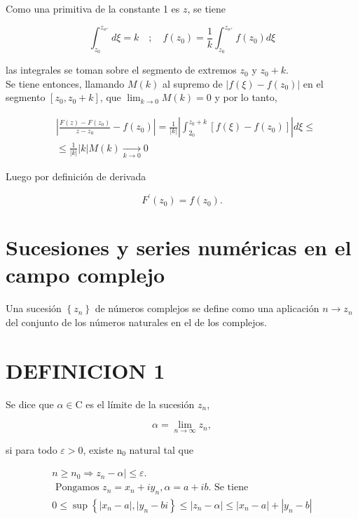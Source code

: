 \documentclass[10pt]{article}
\theoremstyle{plain}
\theoremstyle{definition}
\theoremstyle{remark}
\begin{document}
Como una primitiva de la constante 1 es $z$, se tiene

$$
\int_{z_{0}}^{z_{o^{+}}} d \xi=k \quad ; \quad f\left(z_{0}\right)=\frac{1}{k} \int_{z_{0}}^{z_{o^{+}}} f\left(z_{0}\right) d \xi
$$

las integrales se toman sobre el segmento de extremos $z_{0}$ y $z_{0}+k$.\\
Se tiene entonces, llamando $M(k)$ al supremo de $\left|f(\xi)-f\left(z_{0}\right)\right|$ en el segmento $\left[z_{0}, z_{0}+k\right]$, que $\lim _{k \rightarrow 0} M(k)=0$ y por lo tanto,

$$
\begin{aligned}
& \left|\frac{F(z)-F\left(z_{0}\right)}{z-z_{0}}-f\left(z_{0}\right)\right|=\frac{1}{|k|}\left|\int_{2_{0}}^{z_{0}+k}\left[f(\xi)-f\left(z_{0}\right)\right]\right| d \xi \leqslant \\
& \leqslant \frac{1}{|k|}|k| M(k) \xrightarrow[k \rightarrow 0]{ } 0
\end{aligned}
$$


Luego por definición de derivada

$$
F^{\prime}\left(z_{0}\right)=f\left(z_{0}\right) .
$$

\section{Sucesiones y series numéricas en el campo complejo}
Una sucesión $\left\{z_{n}\right\}$ de números complejos se define como una aplicación $n \rightarrow z_{n}$ del conjunto de los números naturales en el de los complejos.

\section*{DEFINICION 1}
Se dice que $\alpha \in \mathrm{C}$ es el límite de la sucesión $z_{n}$,

$$
\alpha=\lim _{n \rightarrow \infty} z_{n},
$$

si para todo $\varepsilon>0$, existe $\mathrm{n}_{0}$ natural tal que


\begin{gather*}
n \geqslant n_{0} \Rightarrow z_{n}-\alpha \mid \leqslant \varepsilon .  \tag{7-1}\\
\text { Pongamos } z_{n}=x_{n}+i y_{n}, \alpha=a+i b . \text { Se tiene } \\
0 \leqslant \sup \left\{\left|x_{n}-a\right|, \mid y_{n}-b i\right\} \leqslant\left|z_{n}-\alpha\right| \leqslant\left|x_{n}-a\right|+\left|y_{n}-b\right|
\end{gather*}
\end{document}
